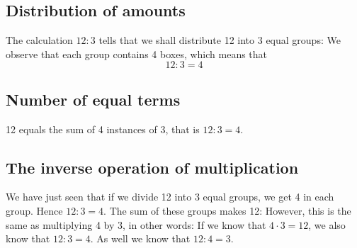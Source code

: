 \subsection*{Distribution of amounts}
The calculation $ {12:3} $ tells that we shall distribute 12 into 3 equal groups:
We observe that each group contains 4 boxes, which means that
\[ 12:3=4 \]


\subsection*{Number of equal terms}
12 equals the sum of 4 instances of 3, that is $ 12:3=4 $.


\subsection*{The inverse operation of multiplication}
We have just seen that if we divide 12 into 3 equal groups, we get 4 in each group. Hence $ 12:3=4$. The sum of these groups makes 12: 
However, this is the same as multiplying 4 by 3, in other words:
If we know that $ {4\cdot 3=12} $, we also know that $ {12:3=4} $. As well we know that $ {12:4=3} $. 





